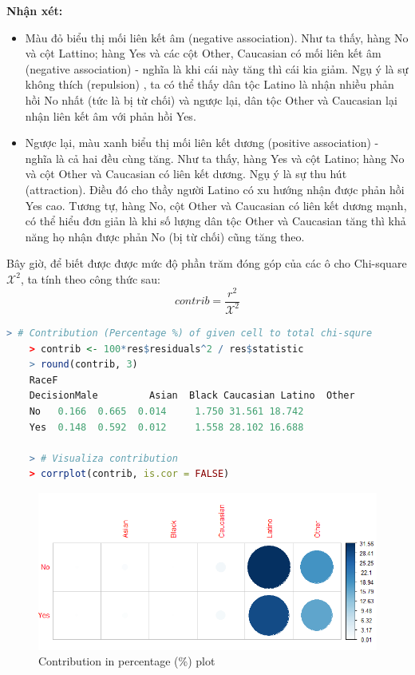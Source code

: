 \documentclass[a4paper,12pt]{article}
\begin{document}
	
	\textbf{Nhận xét:}
	\begin{itemize}
		\item Màu đỏ biểu thị mối liên kết âm (negative association). Như ta thấy, hàng No và cột Lattino; hàng Yes và các cột Other, Caucasian có mối liên kết âm (negative association) - nghĩa là khi cái này tăng thì cái kia giảm. Ngụ ý là sự không thích (repulsion) , ta có thể thấy dân tộc Latino là nhận nhiều phản hồi No nhất (tức là bị từ chối) và ngược lại, dân tộc Other và Caucasian lại nhận liên kết âm với phản hồi Yes.
		\item Ngược lại, màu xanh biểu thị mối liên kết dương (positive association) - nghĩa là cả hai đều cùng tăng. Như ta thấy, hàng Yes và cột Latino; hàng No và cột Other và Caucasian có liên kết dương. Ngụ ý là sự thu hút (attraction). Điều đó cho thầy người Latino có xu hướng nhận được phản hồi Yes cao. Tương tự, hàng No, cột Other và Caucasian có liên kết dương mạnh, có thể hiểu đơn giản là khi số lượng dân tộc Other và Caucasian tăng thì khả năng họ nhận được phản No (bị từ chối) cũng tăng theo.
	\end{itemize}
	
	Bây giờ, để biết được được mức độ phần trăm đóng góp của các ô cho Chi-square $\mathcal{X}^2$, ta tính theo công thức sau:
	$$contrib = \frac{r^2}{\mathcal{X}^2}$$
	
	\begin{lstlisting}[language=R]
	> # Contribution (Percentage %) of given cell to total chi-squre
	> contrib <- 100*res$residuals^2 / res$statistic
	> round(contrib, 3)
	RaceF
	DecisionMale         Asian  Black Caucasian Latino  Other
	No   0.166  0.665  0.014     1.750 31.561 18.742
	Yes  0.148  0.592  0.012     1.558 28.102 16.688
	
	> # Visualiza contribution
	> corrplot(contrib, is.cor = FALSE)
	\end{lstlisting}
	
	\begin{figure}[H]
		\centering
		\includegraphics[width=0.7\linewidth]{contrib}
		\caption{Contribution in percentage (\%) plot}
		\label{fig:contrib}
	\end{figure}
	
\end{document}

